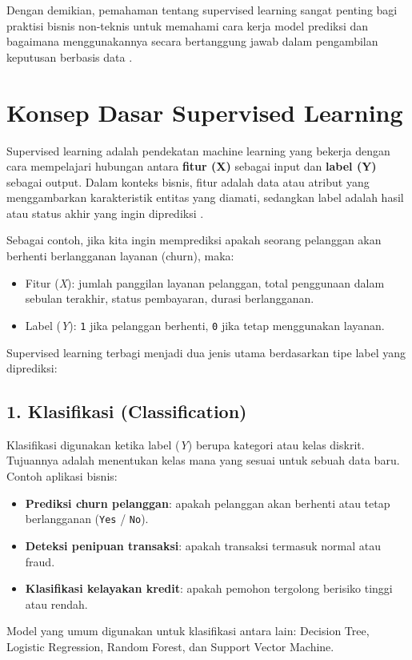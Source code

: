 Dengan demikian, pemahaman tentang supervised learning sangat penting bagi praktisi bisnis non-teknis untuk memahami cara kerja model prediksi dan bagaimana menggunakannya secara bertanggung jawab dalam pengambilan keputusan berbasis data \cite{provost2013data}.


\section{Konsep Dasar Supervised Learning}

Supervised learning adalah pendekatan machine learning yang bekerja dengan cara mempelajari hubungan antara \textbf{fitur (X)} sebagai input dan \textbf{label (Y)} sebagai output. Dalam konteks bisnis, fitur adalah data atau atribut yang menggambarkan karakteristik entitas yang diamati, sedangkan label adalah hasil atau status akhir yang ingin diprediksi \cite{provost2013data}.

Sebagai contoh, jika kita ingin memprediksi apakah seorang pelanggan akan berhenti berlangganan layanan (churn), maka:
\begin{itemize}
	\item Fitur (\textit{X}): jumlah panggilan layanan pelanggan, total penggunaan dalam sebulan terakhir, status pembayaran, durasi berlangganan.
	\item Label (\textit{Y}): \texttt{1} jika pelanggan berhenti, \texttt{0} jika tetap menggunakan layanan.
\end{itemize}

Supervised learning terbagi menjadi dua jenis utama berdasarkan tipe label yang diprediksi:

\subsection*{1. Klasifikasi (Classification)}
Klasifikasi digunakan ketika label (\textit{Y}) berupa kategori atau kelas diskrit. Tujuannya adalah menentukan kelas mana yang sesuai untuk sebuah data baru.  
Contoh aplikasi bisnis:
\begin{itemize}
	\item \textbf{Prediksi churn pelanggan}: apakah pelanggan akan berhenti atau tetap berlangganan (\texttt{Yes} / \texttt{No}).
	\item \textbf{Deteksi penipuan transaksi}: apakah transaksi termasuk normal atau fraud.
	\item \textbf{Klasifikasi kelayakan kredit}: apakah pemohon tergolong berisiko tinggi atau rendah.
\end{itemize}
Model yang umum digunakan untuk klasifikasi antara lain: Decision Tree, Logistic Regression, Random Forest, dan Support Vector Machine.

